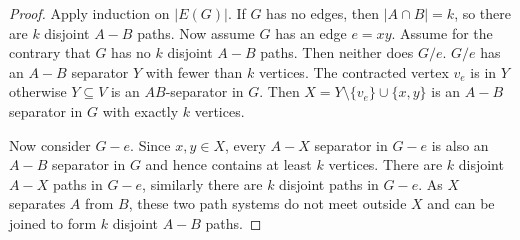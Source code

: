 \documentclass{article}
\begin{document}
\begin{proof}
    Apply induction on $|E(G)|$. If $G$ has no edges, then $|A \cap B| = k$, so there are $k$ disjoint $A-B$ paths. Now assume $G$ has an edge $e = xy$. Assume for the contrary that $G$ has no $k$ disjoint $A-B$ paths. Then neither does $G/e$. $G/e$ has an $A-B$ separator $Y$ with fewer than $k$ vertices. The contracted vertex $v_e$ is in $Y$ otherwise $Y \subseteq V$ is an $AB$-separator in $G$. Then $X = Y \setminus \{v_e\} \cup \{x, y\}$ is an $A-B$ separator in $G$ with exactly $k$ vertices. 

    Now consider $G - e$. Since $x, y \in X$, every $A - X$ separator in $G - e$ is also an $A-B$ separator in $G$ and hence contains at least $k$ vertices. There are $k$ disjoint $A - X$ paths in $G - e$, similarly there are $k$ disjoint paths in $G - e$. As $X$ separates $A$ from $B$, these two path systems do not meet outside $X$ and can be joined to form $k$ disjoint $A-B$ paths. 
\end{proof}
\end{document}
